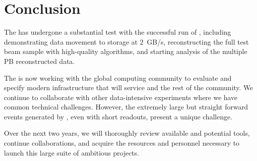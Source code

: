 \section{Conclusion}

The   has undergone a substantial test with the successful run of , including demonstrating data movement to storage at \SI{2}{GB/s}, reconstructing the full test beam sample with high-quality algorithms, and starting analysis of the multiple PB reconstructed data. 

The  is now working with the global  computing community to evaluate and specify modern infrastructure that will service  and the rest of the  community.  We continue to collaborate with other data-intensive experiments where we have common technical challenges. However, the extremely large but straight forward events generated by  , even with short readouts, present a unique challenge. 

Over the next two years, we  will thoroughly review available and potential tools, continue collaborations, and acquire the resources and personnel necessary to launch this large suite of ambitious projects. 
